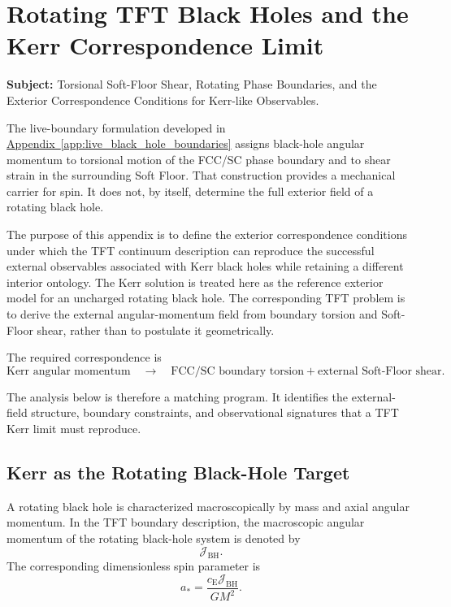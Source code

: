 \chapter{Rotating TFT Black Holes and the Kerr Correspondence Limit}
\label{app:kerr_limit}

\noindent\textbf{Subject:} Torsional Soft-Floor Shear, Rotating Phase Boundaries, and the Exterior Correspondence Conditions for Kerr-like Observables.

The live-boundary formulation developed in \hyperref[app:live_black_hole_boundaries]{Appendix~\ref*{app:live_black_hole_boundaries}} assigns black-hole angular momentum to torsional motion of the FCC/SC phase boundary and to shear strain in the surrounding Soft Floor. That construction provides a mechanical carrier for spin. It does not, by itself, determine the full exterior field of a rotating black hole.

The purpose of this appendix is to define the exterior correspondence conditions under which the TFT continuum description can reproduce the successful external observables associated with Kerr black holes while retaining a different interior ontology. The Kerr solution is treated here as the reference exterior model for an uncharged rotating black hole. The corresponding TFT problem is to derive the external angular-momentum field from boundary torsion and Soft-Floor shear, rather than to postulate it geometrically.

The required correspondence is
\begin{equation}
    \text{Kerr angular momentum} \quad\longrightarrow\quad \text{FCC/SC boundary torsion} + \text{external Soft-Floor shear}.
\end{equation}

The analysis below is therefore a matching program. It identifies the external-field structure, boundary constraints, and observational signatures that a TFT Kerr limit must reproduce.

\section{Kerr as the Rotating Black-Hole Target}
A rotating black hole is characterized macroscopically by mass and axial angular momentum. In the TFT boundary description, the macroscopic angular momentum of the rotating black-hole system is denoted by
\begin{equation}
    \mathcal{J}_{\mathrm{BH}}.
\end{equation}
The corresponding dimensionless spin parameter is
\begin{equation}
    a_\ast = \frac{c_{\mathrm{E}}\mathcal{J}_{\mathrm{BH}}}{GM^2}.
\end{equation}

